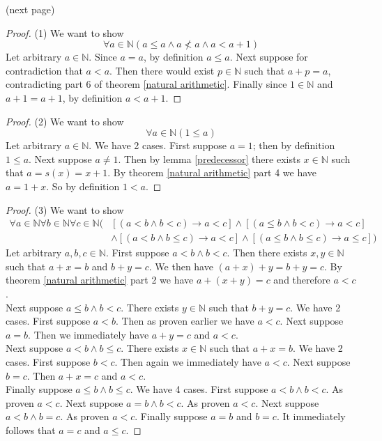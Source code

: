 \documentclass{report}
\begin{document}
\noindent(next page)\newpage
\begin{proof}(1)
We want to show 
\begin{equation*}
\forall a\in\mathbb N(a\leq a\land a\nless a\land a<a+1)
\end{equation*}
Let arbitrary $a\in\mathbb N$. Since $a=a$, by definition $a\leq a$. Next suppose for contradiction that $a<a$. Then there would exist $p\in\mathbb N$ such that $a+p=a$, contradicting part 6
of theorem \ref{natural arithmetic}. Finally since $1\in\mathbb N$ and $a+1=a+1$, by definition $a<a+1$.
\end{proof}
\begin{proof}(2)
We want to show
\begin{equation*}
\forall a\in\mathbb N(1\leq a)
\end{equation*}
Let arbitrary $a\in\mathbb N$. We have 2 cases. First suppose $a=1$; then by definition $1\leq a$.
Next suppose $a\neq1$. Then by lemma \ref{predecessor} there exists $x\in\mathbb N$ such
that $a=s(x)=x+1$. By theorem \ref{natural arithmetic} part 4 we have $a=1+x$. So by definition $1<a$.
\end{proof}
\begin{proof}(3)
We want to show
\begin{align*}
\forall a\in\mathbb N\forall b\in\mathbb N\forall c\in\mathbb N(&[(a<b\land b<c)\to a<c]\land[(a\leq b\land b<c)\to a<c]\\
&\land[(a<b\land b\leq c)\to a<c]\land[(a\leq b\land b\leq c)\to a\leq c])
\end{align*}
Let arbitrary $a,b,c\in\mathbb N$. First suppose $a<b\land b<c$. Then there exists $x,y\in\mathbb N$ such that $a+x=b$ and $b+y=c$. We then have $(a+x)+y=b+y=c$. By
theorem \ref{natural arithmetic} part 2 we have $a+(x+y)=c$ and therefore $a<c$.\\
\indent Next suppose $a\leq b\land b<c$. There exists $y\in\mathbb N$ such that $b+y=c$.
We have 2 cases. First suppose $a<b$. Then as proven earlier we have $a<c$. Next suppose $a=b$.
Then we immediately have $a+y=c$ and $a<c$.\\
\indent Next suppose $a<b\land b\leq c$. There exists $x\in\mathbb N$ such that $a+x=b$.
We have 2 cases. First suppose $b<c$. Then again we immediately have $a<c$. Next suppose $b=c$. Then $a+x=c$ and $a<c$.\\
\indent Finally suppose $a\leq b\land b\leq c$. We have 4 cases. First suppose $a<b\land b<c$. As proven $a<c$. Next suppose $a=b\land b<c$. As proven $a<c$. 
Next suppose $a<b\land b=c$. As proven $a<c$. Finally suppose $a=b$ and $b=c$. It immediately follows that $a=c$ and $a\leq c$.
\end{proof}
\end{document}
